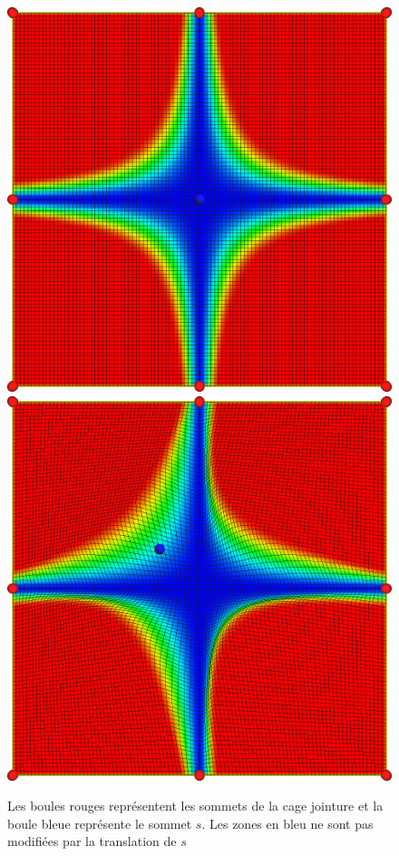 \begin{figure}[h]
  \begin{center}
    \includegraphics[scale=0.35]{starCage-jointure}
    \includegraphics[scale=0.35]{starCage-jointure-deformation}
    \caption{Les boules rouges représentent les sommets de la cage
      jointure et la boule bleue représente le sommet $s$. Les zones
      en bleu ne sont pas modifiées par la translation de $s$}
    \label{MELjoi}
  \end{center}
\end{figure}


